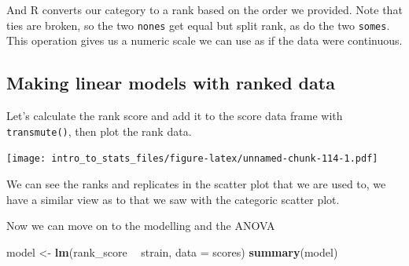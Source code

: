 \documentclass[
]{book}
\newenvironment{Shaded}{\begin{snugshade}}{\end{snugshade}}
\newcommand{\DataTypeTok}[1]{\textcolor[rgb]{0.13,0.29,0.53}{#1}}
\newcommand{\KeywordTok}[1]{\textcolor[rgb]{0.13,0.29,0.53}{\textbf{#1}}}
\newcommand{\NormalTok}[1]{#1}
\newcommand{\OperatorTok}[1]{\textcolor[rgb]{0.81,0.36,0.00}{\textbf{#1}}}
\newcommand{\OtherTok}[1]{\textcolor[rgb]{0.56,0.35,0.01}{#1}}
\newcommand{\StringTok}[1]{\textcolor[rgb]{0.31,0.60,0.02}{#1}}
\begin{document}
And R converts our category to a rank based on the order we provided. Note that ties are broken, so the two \texttt{nones} get equal but split rank, as do the two \texttt{somes}. This operation gives us a numeric scale we can use as if the data were continuous.

\hypertarget{making-linear-models-with-ranked-data}{%
\subsection{Making linear models with ranked data}\label{making-linear-models-with-ranked-data}}

Let's calculate the rank score and add it to the score data frame with \texttt{transmute()}, then plot the rank data.

\begin{Shaded}
\end{Shaded}

\texttt{[image: intro\_to\_stats\_files/figure-latex/unnamed-chunk-114-1.pdf]}

We can see the ranks and replicates in the scatter plot that we are used to, we have a similar view as to that we saw with the categoric scatter plot.

Now we can move on to the modelling and the ANOVA

\begin{Shaded}
\begin{Highlighting}[]
\NormalTok{model <-}\StringTok{ }\KeywordTok{lm}\NormalTok{(rank_score }\OperatorTok{~}\StringTok{ }\NormalTok{strain, }\DataTypeTok{data =}\NormalTok{ scores)}
\KeywordTok{summary}\NormalTok{(model)}
\end{Highlighting}
\end{Shaded}
\end{document}
